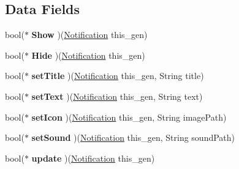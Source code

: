 \subsection*{Data Fields}
\begin{DoxyCompactItemize}
\item 
\hypertarget{struct__Notification_a28503331820f1f4398d364d5b91e2fa7}{bool($\ast$ {\bfseries Show} )(\hyperlink{struct__Notification}{Notification} this\-\_\-gen)}\label{struct__Notification_a28503331820f1f4398d364d5b91e2fa7}

\item 
\hypertarget{struct__Notification_a7b8cf28c81df8b862b3807b12e7b61d7}{bool($\ast$ {\bfseries Hide} )(\hyperlink{struct__Notification}{Notification} this\-\_\-gen)}\label{struct__Notification_a7b8cf28c81df8b862b3807b12e7b61d7}

\item 
\hypertarget{struct__Notification_aaf83703d808861386bac49759ead838d}{bool($\ast$ {\bfseries set\-Title} )(\hyperlink{struct__Notification}{Notification} this\-\_\-gen, String title)}\label{struct__Notification_aaf83703d808861386bac49759ead838d}

\item 
\hypertarget{struct__Notification_a091c06813fa1ab4de61a0ee35bec8e20}{bool($\ast$ {\bfseries set\-Text} )(\hyperlink{struct__Notification}{Notification} this\-\_\-gen, String text)}\label{struct__Notification_a091c06813fa1ab4de61a0ee35bec8e20}

\item 
\hypertarget{struct__Notification_a3f187e1b013e95f0f6ded337555adc70}{bool($\ast$ {\bfseries set\-Icon} )(\hyperlink{struct__Notification}{Notification} this\-\_\-gen, String image\-Path)}\label{struct__Notification_a3f187e1b013e95f0f6ded337555adc70}

\item 
\hypertarget{struct__Notification_abc6e65ade4683b73dab3ee91fbf790bc}{bool($\ast$ {\bfseries set\-Sound} )(\hyperlink{struct__Notification}{Notification} this\-\_\-gen, String sound\-Path)}\label{struct__Notification_abc6e65ade4683b73dab3ee91fbf790bc}

\item 
\hypertarget{struct__Notification_a8729bcac878741776e27753c6429b60e}{bool($\ast$ {\bfseries update} )(\hyperlink{struct__Notification}{Notification} this\-\_\-gen)}\label{struct__Notification_a8729bcac878741776e27753c6429b60e}

\end{DoxyCompactItemize}


